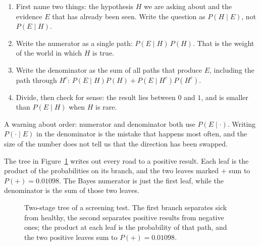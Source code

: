 \begin{resep}
\begin{enumerate}
  \item First name two things: the hypothesis $H$ we are asking about and the evidence $E$
        that has already been seen. Write the question as $P(H\mid E)$, not $P(E\mid H)$.
  \item Write the numerator as a single path: $P(E\mid H)\,P(H)$. That is the weight of the
        world in which $H$ is true.
  \item Write the denominator as the sum of all paths that produce $E$, including the path
        through $H^{c}$: $P(E\mid H)P(H)+P(E\mid H^{c})P(H^{c})$.
  \item Divide, then check for sense: the result lies between $0$ and $1$, and is smaller
        than $P(E\mid H)$ when $H$ is rare.
\end{enumerate}
A warning about order: numerator and denominator both use $P(E\mid\cdot)$. Writing
$P(\cdot\mid E)$ in the denominator is the mistake that happens most often, and the size of
the number does not tell us that the direction has been swapped.
\end{resep}

The tree in Figure~\ref{fig:pohon} writes out every road to a positive result. Each leaf is
the product of the probabilities on its branch, and the two leaves marked $+$ sum to
$P(+)=0.01098$. The Bayes numerator is just the first leaf, while the denominator is the
sum of those two leaves.

    \begin{figure}[htbp]
\centering
{}
\caption{Two-stage tree of a screening test. The first branch separates sick from healthy,
the second separates positive results from negative ones; the product at each leaf is the
probability of that path, and the two positive leaves sum to $P(+)=0.01098$.}
\label{fig:pohon}
\end{figure}    

